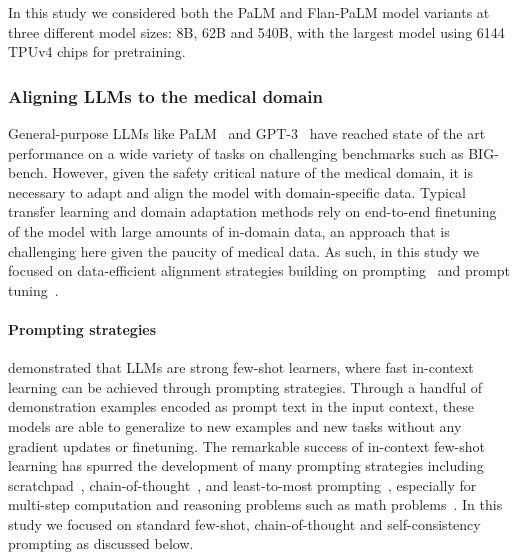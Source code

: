 \documentclass[10pt, letter, onecolumn]{arxiv}
\begin{document}
\begin{refsection}
In this study we considered both the PaLM and Flan-PaLM model variants at three different model sizes: 8B, 62B and 540B, with the largest model using 6144 TPUv4 chips for pretraining.

\subsubsection{Aligning LLMs to the medical domain}
\label{sec:aligning-llms-to-medical-domain}
General-purpose LLMs like PaLM~\cite{chowdhery2022palm} and GPT-3~\cite{brown2020language} have reached state of the art performance on a wide variety of tasks on challenging benchmarks such as BIG-bench. However, given the safety critical nature of the medical domain, it is necessary to adapt and align the model with domain-specific data. Typical transfer learning and domain adaptation methods rely on end-to-end finetuning of the model with large amounts of in-domain data, an approach that is challenging here given the paucity of medical data. As such, in this study we focused on data-efficient alignment strategies building on prompting~\cite{brown2020language} and prompt tuning~\cite{lester2021power}.

\paragraph{Prompting strategies} \citet{brown2020language} demonstrated that LLMs are strong few-shot learners, where fast in-context learning can be achieved through prompting strategies. Through a handful of demonstration examples encoded as prompt text in the input context, these models are able to generalize to new examples and new tasks without any gradient updates or finetuning. The remarkable success of in-context few-shot learning has spurred the development of many prompting strategies including scratchpad~\cite{nye2021show}, chain-of-thought~\cite{wei2022chain}, and least-to-most prompting~\cite{zhou2022least}, especially for multi-step computation and reasoning problems such as math problems~\cite{cobbe2021training}. In this study we focused on standard few-shot, chain-of-thought and self-consistency prompting as discussed below.



\end{refsection}
\end{document}
